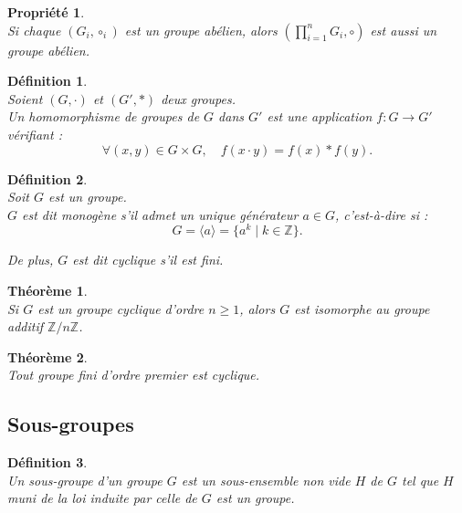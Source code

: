 \documentclass[a4paper, 14pt]{report}
\newtheorem{definition}{Définition}[section]
\newtheorem{propriety}{Propriété}[section]
\newtheorem{theorem}{Théorème}[section]
\begin{document}
\begin{onehalfspace}
{			\begin{propriety} \cite{schaub1997} \\
Si chaque \( (G_i, \circ_i) \) est un groupe abélien, alors \( \left( \prod_{i=1}^{n} G_i, \circ \right) \) est aussi un groupe abélien.
			\end{propriety}
			
			
			\begin{definition} \cite{schaub1997} \\
Soient $(G, \cdot)$ et $(G', *)$ deux groupes.\\
Un homomorphisme de groupes de $G$ dans $G'$ est une application $f : G \rightarrow G'$ vérifiant :
				\[
				\forall (x, y) \in G \times G, \quad f(x \cdot y) = f(x) * f(y).
				\]
			\end{definition}

			
			\begin{definition} \cite{schaub1997}  \\
	Soit $G$ est un groupe.\\
				\( G \) est dit monogène s'il admet un unique générateur \( a \in G \), c'est-à-dire si :
				\[
				G = \langle a \rangle = \{ a^k \mid k \in \mathbb{Z} \}.
				\]
				
				De plus, \( G \) est dit cyclique s'il est fini.
			\end{definition}
			
			\begin{theorem} \cite{schaub1997} \\
Si \( G \) est un groupe cyclique d’ordre \( n \geq 1 \), alors \( G \) est isomorphe au groupe additif \( \mathbb{Z}/n\mathbb{Z} \).
			\end{theorem}
			
			\begin{theorem} \cite{schaub1997} \\
Tout groupe fini d’ordre premier est cyclique.
			\end{theorem}
			
			
			\subsection{Sous-groupes}
			\begin{definition} \cite{hall2018theory} \\
Un sous-groupe d'un groupe $G$ est un sous-ensemble non vide $H$ de $G$ tel que $H$ muni  de la loi induite par celle de $G$ est un groupe.
			\end{definition}
			
}
\end{onehalfspace}
\end{document}
